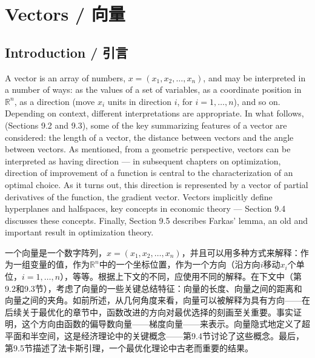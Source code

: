 
\section{Vectors / 向量}

\subsection{Introduction / 引言}

\begin{original}
A vector is an array of numbers, $x = (x_1, x_2, \dots, x_n)$, and may be interpreted in a number of ways: as the values of a set of variables, as a coordinate position in $\mathbb{R}^n$, as a direction (move $x_i$ units in direction $i$, for $i = 1, \dots, n$), and so on. Depending on context, different interpretations are appropriate. In what follows, (Sections 9.2 and 9.3), some of the key summarizing features of a vector are considered: the length of a vector, the distance between vectors and the angle between vectors. As mentioned, from a geometric perspective, vectors can be interpreted as having direction --- in subsequent chapters on optimization, direction of improvement of a function is central to the characterization of an optimal choice. As it turns out, this direction is represented by a vector of partial derivatives of the function, the gradient vector. Vectors implicitly define hyperplanes and halfspaces, key concepts in economic theory --- Section 9.4 discusses these concepts. Finally, Section 9.5 describes Farkas' lemma, an old and important result in optimization theory.
\end{original}
\begin{translation}
一个向量是一个数字阵列，$x = (x_1, x_2, \dots, x_n)$，并且可以用多种方式来解释：作为一组变量的值，作为$\mathbb{R}^n$中的一个坐标位置，作为一个方向（沿方向$i$移动$x_i$个单位，$i = 1, \dots, n$），等等。根据上下文的不同，应使用不同的解释。在下文中（第9.2和9.3节），考虑了向量的一些关键总结特征：向量的长度、向量之间的距离和向量之间的夹角。如前所述，从几何角度来看，向量可以被解释为具有方向——在后续关于最优化的章节中，函数改进的方向对最优选择的刻画至关重要。事实证明，这个方向由函数的偏导数向量——梯度向量——来表示。向量隐式地定义了超平面和半空间，这是经济理论中的关键概念——第9.4节讨论了这些概念。最后，第9.5节描述了法卡斯引理，一个最优化理论中古老而重要的结果。
\end{translation}

